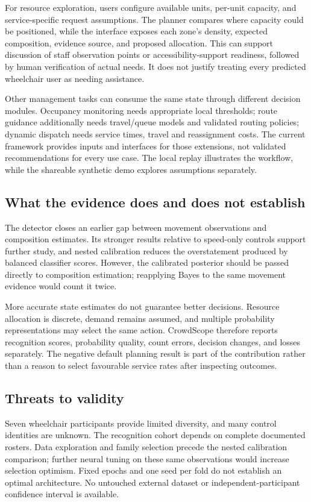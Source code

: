 \documentclass[conference]{IEEEtran}
\begin{document}
For resource exploration, users configure available units, per-unit capacity, and service-specific request assumptions. The planner compares where capacity could be positioned, while the interface exposes each zone's density, expected composition, evidence source, and proposed allocation. This can support discussion of staff observation points or accessibility-support readiness, followed by human verification of actual needs. It does not justify treating every predicted wheelchair user as needing assistance.

Other management tasks can consume the same state through different decision modules. Occupancy monitoring needs appropriate local thresholds; route guidance additionally needs travel/queue models and validated routing policies; dynamic dispatch needs service times, travel and reassignment costs. The current framework provides inputs and interfaces for those extensions, not validated recommendations for every use case. The local replay illustrates the workflow, while the shareable synthetic demo explores assumptions separately.

\subsection{What the evidence does and does not establish}
The detector closes an earlier gap between movement observations and composition estimates. Its stronger results relative to speed-only controls support further study, and nested calibration reduces the overstatement produced by balanced classifier scores. However, the calibrated posterior should be passed directly to composition estimation; reapplying Bayes to the same movement evidence would count it twice.

More accurate state estimates do not guarantee better decisions. Resource allocation is discrete, demand remains assumed, and multiple probability representations may select the same action. CrowdScope therefore reports recognition scores, probability quality, count errors, decision changes, and losses separately. The negative default planning result is part of the contribution rather than a reason to select favourable service rates after inspecting outcomes.

\subsection{Threats to validity}
Seven wheelchair participants provide limited diversity, and many control identities are unknown. The recognition cohort depends on complete documented rosters. Data exploration and family selection precede the nested calibration comparison; further neural tuning on these same observations would increase selection optimism. Fixed epochs and one seed per fold do not establish an optimal architecture. No untouched external dataset or independent-participant confidence interval is available.
\end{document}

